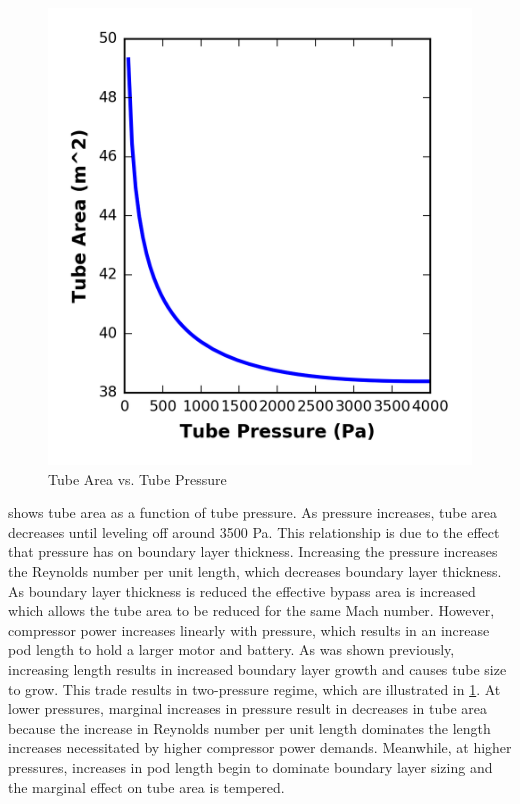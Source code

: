 \begin{figure}
	\centering
	\includegraphics[width=.45\textwidth]{../../images/graphs/pressure_trades/pressure_vs_Area.png}
	\caption{Tube Area vs. Tube Pressure}
	\label{fig:tube_area_vs_tube_press}
\end{figure}
 shows tube area as a function of tube pressure.
As pressure increases, tube area decreases until leveling off around 3500 Pa.
This relationship is due to the effect that pressure has on boundary layer thickness.
Increasing the pressure increases the Reynolds number per unit length,
which decreases boundary layer thickness. As boundary layer thickness is
reduced the effective bypass area is increased which allows the tube area to
be reduced for the same Mach number. However, compressor power increases
linearly with pressure, which results in an increase pod length to hold a
larger motor and battery. As was shown previously, increasing length results in
increased boundary layer growth and causes tube size to grow. This trade
results in two-pressure regime, which are illustrated in \cref{fig:tube_area_vs_tube_press}.
At lower pressures, marginal increases in pressure result in decreases in tube
area because the increase in Reynolds number per unit length dominates the
length increases necessitated by higher compressor power demands. Meanwhile,
at higher pressures, increases in pod length begin to dominate boundary layer
sizing and the marginal effect on tube area is tempered.
